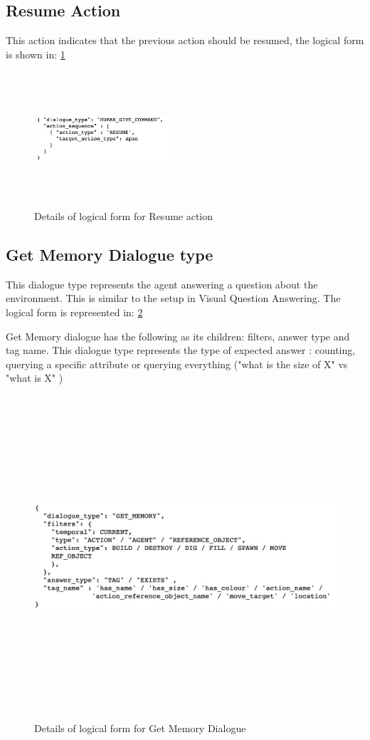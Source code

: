 \subsection{Resume Action}
This action indicates that the previous action should be resumed, the logical form is shown in: \ref{fig:resume_dict}
\begin{figure}[h]
    \centering
    \includegraphics[width=5cm,height=5cm,keepaspectratio]{figures/resume.png}
    \caption{Details of logical form for Resume action}
    \label{fig:resume_dict}
\end{figure}

\subsection{Get Memory Dialogue type}
This dialogue type represents the agent answering a question about the environment.
This is similar to the setup in Visual Question Answering. The logical form is represented in: \ref{fig:answer_dict}

Get Memory dialogue has the following as its children: filters, answer type and tag name.
This dialogue type represents the type of expected answer : counting, querying a specific attribute or querying everything ("what is the size of X" vs "what is X" )
\begin{figure}[h]
    \centering
    \includegraphics[width=12cm,height=12cm,keepaspectratio]{figures/answer.png}
    \caption{Details of logical form for Get Memory Dialogue}
    \label{fig:answer_dict}
\end{figure}



